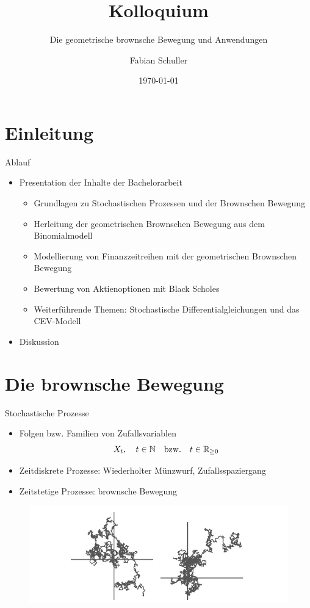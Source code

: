 \documentclass{beamer}
\title[Kolloquium]{Kolloquium}
\subtitle[Die geometrische brownsche Bewegung und Anwendungen]{Die geometrische brownsche Bewegung und Anwendungen}
\author{Fabian Schuller}
\date{\today}
\begin{document}
\section{Einleitung}

\begin{frame}
  \titlepage
\end{frame}

\begin{frame}{Ablauf}
  \begin{itemize}
    \item Presentation der Inhalte der Bachelorarbeit
    \begin{itemize}
      \item Grundlagen zu Stochastischen Prozessen und der Brownschen Bewegung
      \item Herleitung der geometrischen Brownschen Bewegung aus dem Binomialmodell
      \item Modellierung von Finanzzeitreihen mit der geometrischen Brownschen Bewegung
      \item Bewertung von Aktienoptionen mit Black Scholes
      \item Weiterführende Themen: Stochastische Differentialgleichungen und das CEV-Modell
    \end{itemize}
    \item Diskussion
  \end{itemize}
\end{frame}

\section{Die brownsche Bewegung}

\begin{frame}{Stochastische Prozesse}
    \begin{itemize}
      \item Folgen bzw. Familien von Zufallsvariablen $$X_t,\quad t \in \Bbb N \quad \mathrm{ bzw. } \quad  t \in \Bbb R_{\ge 0}$$
      \item Zeitdiskrete Prozesse: Wiederholter Münzwurf, Zufallsspaziergang
      \item Zeitstetige Prozesse: brownsche Bewegung
    \end{itemize}
    \begin{figure}
      \centering
      \includegraphics[width=1\textwidth]{images/bb_2d.png}
    \end{figure}
\end{frame}
\end{document}
